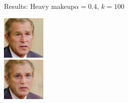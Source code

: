 \documentclass[11pt]{beamer}
\begin{document}
\begin{frame}{Results: Heavy makeup}{$\alpha=0.4$, $k=100$}
\begin{minipage}{81px}
	\end{minipage}%
	\begin{minipage}{81px}
		\includegraphics[width=80px]{../pictures/outputs/start-imgs/Bush.png}\\
		\includegraphics[width=80px]{../pictures/outputs/heavy_makeup_alpha0.4_k100/Bush.png}
	\end{minipage}
\end{frame}

\end{document}
